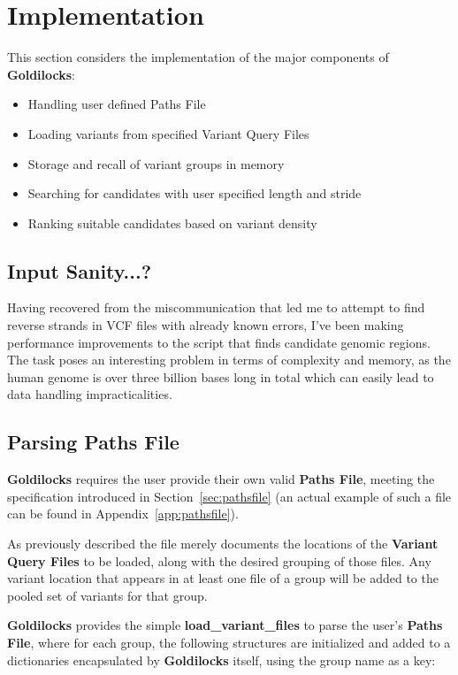 \section{Implementation}

This section considers the implementation of the major components of
\textbf{Goldilocks}:

\begin{itemize}
    \item Handling user defined Paths File
    \item Loading variants from specified Variant Query Files
    \item Storage and recall of variant groups in memory
    \item Searching for candidates with user specified length and stride
    \item Ranking suitable candidates based on variant density
\end{itemize}

\subsection{Input Sanity...?}
Having recovered from the miscommunication that led me to attempt to find
reverse strands in VCF files with already known errors, I’ve been making
performance improvements to the script that finds candidate genomic regions.
The task poses an interesting problem in terms of complexity and memory, as the
human genome is over three billion bases long in total which can easily lead to
data handling impracticalities.


\subsection{Parsing Paths File}
\label{sec:parse-path}

\textbf{Goldilocks} requires the user provide their own valid \textbf{Paths
File}, meeting the specification introduced in Section~\ref{sec:pathsfile} (an
actual example of such a file can be found in Appendix~\ref{app:pathsfile}).

As previously described the file merely documents the locations of the
\textbf{Variant Query Files} to be loaded, along with the desired grouping of
those files. Any variant location that appears in at least one file of a group
will be added to the pooled set of variants for that group.

\textbf{Goldilocks} provides the simple \textbf{load\_variant\_files} to parse
the user's \textbf{Paths File}, where for each group, the following structures are
initialized and added to a dictionaries encapsulated by \textbf{Goldilocks}
itself, using the group name as a key:

